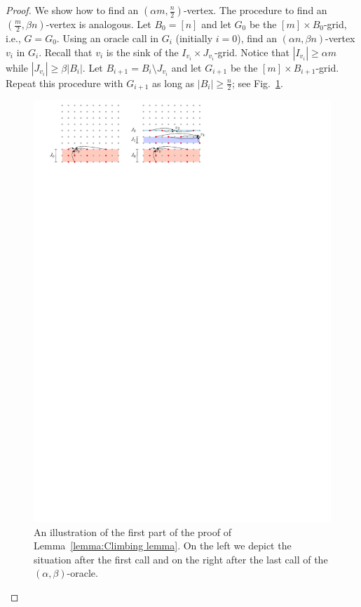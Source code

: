 \documentclass[runningheads,a4paper]{llncs}
\begin{document}
\begin{proof}
We show how to find an $(\alpha m,  \frac{n}{2})$-vertex. The procedure to find an $( \frac{m}{2}, \beta n)$-vertex is analogous.
Let $B_0 = [n]$ and let $G_0$ be the $[m]\times B_0$-grid, i.e., $G = G_0$.
Using an oracle call in $G_i$ (initially $i = 0$), find an $(\alpha n, \beta n)$-vertex $v_i$ in $G_i$. 
Recall that $v_i$ is the sink of the $I_{v_i}\times J_{v_i}$-grid. %
Notice that $|I_{v_i}| \geq \alpha m$ while $|J_{v_i}| \geq \beta |B_i|$.
Let $B_{i+1} = B_i\setminus J_{v_i}$ and let $G_{i+1}$ be the $[m]\times B_{i+1}$-grid. 
Repeat this procedure with $G_{i+1}$ as long as $|B_i| \geq  \frac{n}{2}$; see Fig.~\ref{fig:Climbing Lemma}.


\begin{figure}[bh]
\centering
\includegraphics{ClimbingLemma.pdf}
\caption{\small An illustration of the first part of the proof of Lemma~\ref{lemma:Climbing lemma}. On the left we depict the situation after the first call and on the right after the last call of the $(\alpha, \beta)$-oracle.}
\label{fig:Climbing Lemma}
\end{figure}


\end{proof}
\end{document}
